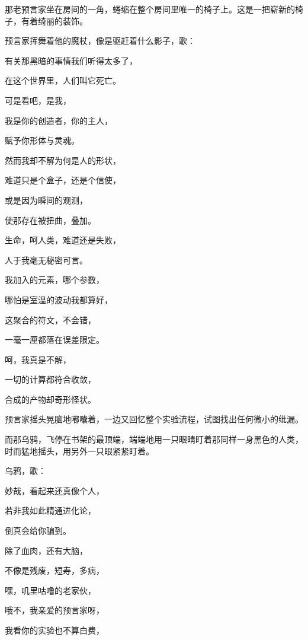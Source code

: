 \documentclass[UTF8]{article}
\begin{document}
\par 那老预言家坐在房间的一角，蜷缩在整个房间里唯一的椅子上。这是一把崭新的椅子，有着绮丽的装饰。
\\[0.6cm]
\par 预言家挥舞着他的魔杖，像是驱赶着什么影子，歌：
\\[0.6cm]
\par 有关那黑暗的事情我们听得太多了，
\par 在这个世界里，人们叫它死亡。
\par 可是看吧，是我，
\par 我是你的创造者，你的主人，
\par 赋予你形体与灵魂。
\par 然而我却不解为何是人的形状，
\par 难道只是个盒子，还是个信使，
\par 或是因为瞬间的观测，
\par 使那存在被扭曲，叠加。
\par 生命，呵人类，难道还是失败，
\par 人于我毫无秘密可言。
\par 我加入的元素，哪个参数，
\par 哪怕是室温的波动我都算好，
\par 这聚合的符文，不会错，
\par 一毫一厘都落在误差限定。
\par 呵，我真是不解，
\par 一切的计算都符合收敛，
\par 合成的产物却奇形怪状。
\\[0.6cm]
\par 预言家摇头晃脑地嘟囔着，一边又回忆整个实验流程，试图找出任何微小的纰漏。
\par 而那乌鸦，飞停在书架的最顶端，端端地用一只眼睛盯着那同样一身黑色的人类，时而猛地摇头，用另外一只眼紧紧盯着。
\\[0.6cm]
\par 乌鸦，歌：
\\[0.6cm]
\par 妙哉，看起来还真像个人，
\par 若非我如此精通进化论，
\par 倒真会给你骗到。
\par 除了血肉，还有大脑，
\par 不像是残废，短寿，多病，
\par 嘿，叽里咕噜的老家伙，
\par 哦不，我亲爱的预言家呀，
\par 我看你的实验也不算白费，
\end{document}
